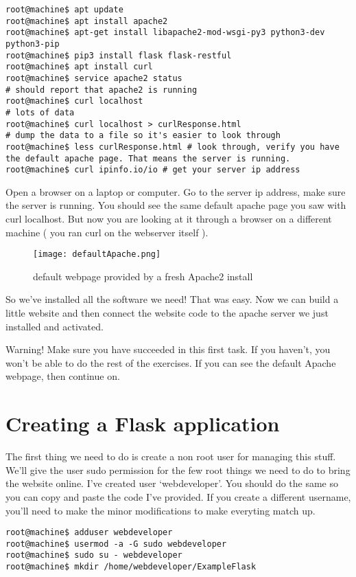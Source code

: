 \documentclass[10pt]{article}
\begin{document}
\begin{lstlisting}
root@machine$ apt update
root@machine$ apt install apache2
root@machine$ apt-get install libapache2-mod-wsgi-py3 python3-dev python3-pip
root@machine$ pip3 install flask flask-restful
root@machine$ apt install curl
root@machine$ service apache2 status
# should report that apache2 is running
root@machine$ curl localhost
# lots of data
root@machine$ curl localhost > curlResponse.html
# dump the data to a file so it's easier to look through
root@machine$ less curlResponse.html # look through, verify you have the default apache page. That means the server is running.
root@machine$ curl ipinfo.io/io # get your server ip address
\end{lstlisting}

Open a browser on a laptop or computer. Go to the server ip address, make sure the server is running. You should see the same default apache page you saw with curl localhost. But now you are looking at it through a browser on a different machine ( you ran curl on the webserver itself ).

\begin{figure}[h]
  \centering
    \texttt{[image: defaultApache.png]}
  \caption{default webpage provided by a fresh Apache2 install}
\end{figure}

So we've installed all the software we need! That was easy. Now we can build a little website and then connect the website code to the apache server we just installed and activated.

{\Large \color{red} Warning! Make sure you have succeeded in this first task. If
you haven't, you won't be able to do the rest of the exercises. If you can see
the default Apache webpage, then continue on. }

\section{Creating a Flask application}
The first thing we need to do is create a non root user for managing this stuff. We'll give the user sudo permission for the few root things we need to do to bring the website online. I've created user `webdeveloper'. You should do the same so you can copy and paste the code I've provided. If you create a different username, you'll need to make the minor modifications to make everyting match up.

\begin{lstlisting}
root@machine$ adduser webdeveloper
root@machine$ usermod -a -G sudo webdeveloper
root@machine$ sudo su - webdeveloper
root@machine$ mkdir /home/webdeveloper/ExampleFlask
\end{lstlisting}
\end{document}
